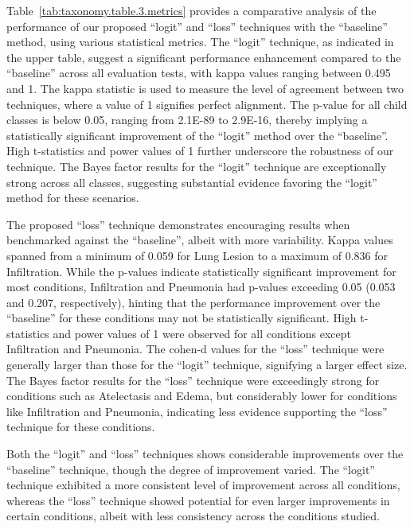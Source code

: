 \documentclass[final,1p,times,authoryear]{elsarticle}
\begin{document}
Table~\ref{tab:taxonomy.table.3.metrics} provides a comparative analysis of the performance of our proposed ``logit'' and ``loss'' techniques with the ``baseline'' method, using various statistical metrics. The ``logit'' technique, as indicated in the upper table, suggest a significant performance enhancement compared to the ``baseline'' across all evaluation tests, with kappa values ranging between 0.495 and 1. The kappa statistic is used to measure the level of agreement between two techniques, where a value of 1 signifies perfect alignment. The p-value for all child classes is below 0.05, ranging from 2.1E-89 to 2.9E-16, thereby implying a statistically significant improvement of the ``logit'' method over the ``baseline''. High t-statistics and power values of 1 further underscore the robustness of our technique. The Bayes factor results for the ``logit'' technique are exceptionally strong across all classes, suggesting substantial evidence favoring the ``logit'' method for these scenarios.

The proposed ``loss'' technique demonstrates encouraging results when benchmarked against the ``baseline'', albeit with more variability. Kappa values spanned from a minimum of 0.059 for Lung Lesion to a maximum of 0.836 for Infiltration. While the p-values indicate statistically significant improvement for most conditions, Infiltration and Pneumonia had p-values exceeding 0.05 (0.053 and 0.207, respectively), hinting that the performance improvement over the ``baseline'' for these conditions may not be statistically significant. High t-statistics and power values of 1 were observed for all conditions except Infiltration and Pneumonia. The cohen-d values for the ``loss'' technique were generally larger than those for the ``logit'' technique, signifying a larger effect size. The Bayes factor results for the ``loss'' technique were exceedingly strong for conditions such as Atelectasis and Edema, but considerably lower for conditions like Infiltration and Pneumonia, indicating less evidence supporting the ``loss'' technique for these conditions.

Both the ``logit'' and ``loss'' techniques shows considerable improvements over the ``baseline'' technique, though the degree of improvement varied. The ``logit'' technique exhibited a more consistent level of improvement across all conditions, whereas the ``loss'' technique showed potential for even larger improvements in certain conditions, albeit with less consistency across the conditions studied.
\end{document}
